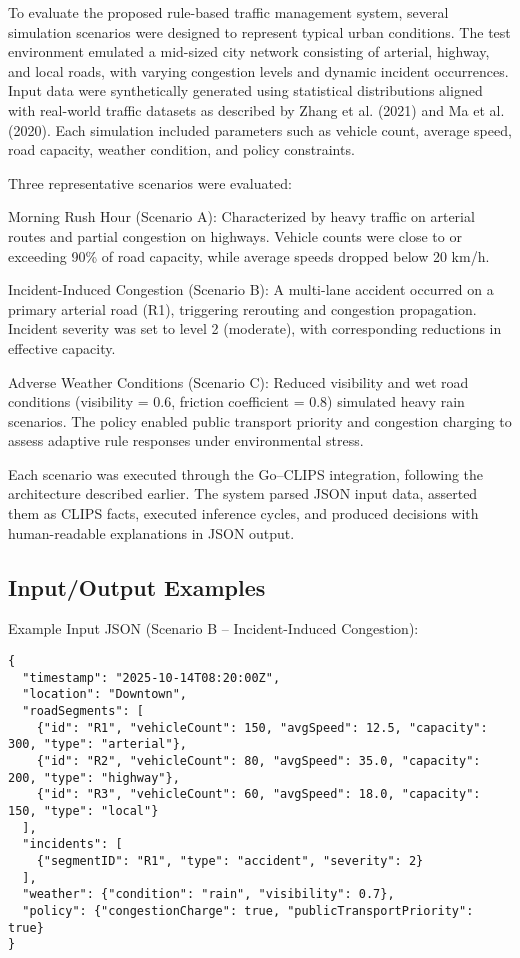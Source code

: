 \documentclass{article}
\begin{document}
To evaluate the proposed rule-based traffic management system, several simulation scenarios were designed to represent typical urban conditions. The test environment emulated a mid-sized city network consisting of arterial, highway, and local roads, with varying congestion levels and dynamic incident occurrences. Input data were synthetically generated using statistical distributions aligned with real-world traffic datasets as described by Zhang et al. (2021) and Ma et al. (2020). Each simulation included parameters such as vehicle count, average speed, road capacity, weather condition, and policy constraints.

Three representative scenarios were evaluated:

Morning Rush Hour (Scenario A):
Characterized by heavy traffic on arterial routes and partial congestion on highways. Vehicle counts were close to or exceeding 90\% of road capacity, while average speeds dropped below 20 km/h.

Incident-Induced Congestion (Scenario B):
A multi-lane accident occurred on a primary arterial road (R1), triggering rerouting and congestion propagation. Incident severity was set to level 2 (moderate), with corresponding reductions in effective capacity.

Adverse Weather Conditions (Scenario C):
Reduced visibility and wet road conditions (visibility = 0.6, friction coefficient = 0.8) simulated heavy rain scenarios. The policy enabled public transport priority and congestion charging to assess adaptive rule responses under environmental stress.

Each scenario was executed through the Go–CLIPS integration, following the architecture described earlier. The system parsed JSON input data, asserted them as CLIPS facts, executed inference cycles, and produced decisions with human-readable explanations in JSON output.

\subsection{Input/Output Examples}

Example Input JSON (Scenario B – Incident-Induced Congestion):
\begin{verbatim}
{
  "timestamp": "2025-10-14T08:20:00Z",
  "location": "Downtown",
  "roadSegments": [
    {"id": "R1", "vehicleCount": 150, "avgSpeed": 12.5, "capacity": 300, "type": "arterial"},
    {"id": "R2", "vehicleCount": 80, "avgSpeed": 35.0, "capacity": 200, "type": "highway"},
    {"id": "R3", "vehicleCount": 60, "avgSpeed": 18.0, "capacity": 150, "type": "local"}
  ],
  "incidents": [
    {"segmentID": "R1", "type": "accident", "severity": 2}
  ],
  "weather": {"condition": "rain", "visibility": 0.7},
  "policy": {"congestionCharge": true, "publicTransportPriority": true}
}
\end{verbatim}
\end{document}
